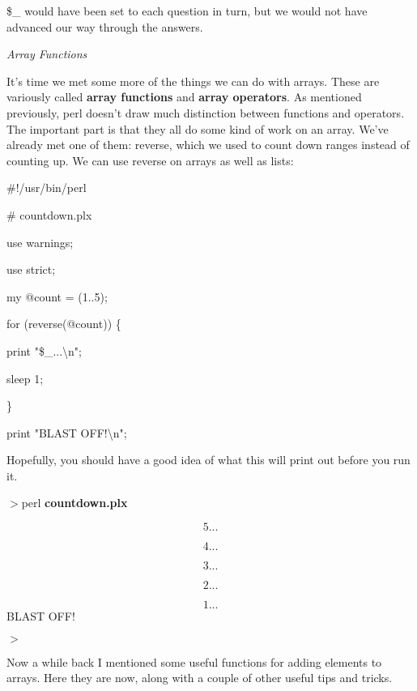 \documentclass[a4paper,11pt]{book}
\begin{document}
\noindent 

\noindent \$\_ would have been set to each question in turn, but we would not have advanced our way through the answers.

\noindent 

\noindent \textit{Array Functions}

\noindent It's time we met some more of the things we can do with arrays. These are variously called \textbf{array functions }and \textbf{array operators}. As mentioned previously, perl doesn't draw much distinction between functions and operators. The important part is that they all do some kind of work on an array. We've already met one of them: reverse, which we used to count down ranges instead of counting up. We can use reverse on arrays as well as lists:

\noindent 

\noindent 

\noindent \#!/usr/bin/perl

\noindent \# countdown.plx

\noindent use warnings;

\noindent use strict;

\noindent 

\noindent my @count = (1..5);

\noindent for (reverse(@count)) \{

\noindent print "\$\_...\textbackslash n";

\noindent sleep 1;

\noindent \}

\noindent 

\noindent print "BLAST OFF!\textbackslash n";

\noindent 

\noindent 

\noindent Hopefully, you should have a good idea of what this will print out before you run it.

\noindent 

\noindent $>$perl \textbf{countdown.plx}

\[5...\] 

\[4...\] 

\[3...\] 

\[2...\] 

\[1...\] 
BLAST OFF!

\noindent $>$

\noindent 

\noindent Now a while back I mentioned some useful functions for adding elements to arrays. Here they are now, along with a couple of other useful tips and tricks.
\end{document}
